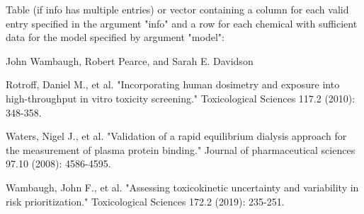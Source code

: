 \documentclass[a4paper]{book}
\begin{document}
\begin{Value}
\begin{ldescription}
\item[\code{vector/data.table}] Table (if info has multiple entries) or 
vector containing a column for each valid entry 
specified in the argument "info" and a row for each chemical with sufficient
data for the model specified by argument "model":


\end{ldescription}
\end{Value}
%
\begin{Author}\relax
John Wambaugh, Robert Pearce, and Sarah E. Davidson
\end{Author}
%
\begin{References}\relax
Rotroff, Daniel M., et al. "Incorporating human dosimetry and exposure into 
high-throughput in vitro toxicity screening." Toxicological Sciences 117.2 
(2010): 348-358.

Waters, Nigel J., et al. "Validation of a rapid equilibrium dialysis approach 
for the measurement of plasma protein binding." Journal of pharmaceutical 
sciences 97.10 (2008): 4586-4595.

Wambaugh, John F., et al. "Assessing toxicokinetic uncertainty and 
variability in risk prioritization." Toxicological Sciences 172.2 (2019): 
235-251.
\end{References}
\end{document}
